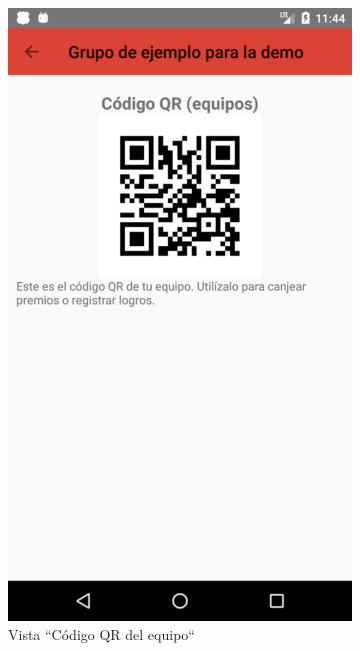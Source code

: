 \documentclass[twoside]{report}
\begin{document}
\begin{figure}[H]
\begin{center}
	\begin{subfigure}[t]{.3\linewidth}
		\includegraphics[scale=0.25]{images/userguide/19.png}
		\caption{Vista “Código QR del equipo“}
	\end{subfigure}\hspace{5mm}%
	\begin{subfigure}[t]{.3\linewidth}

\end{subfigure}
\end{center}
\end{figure}
\end{document}
